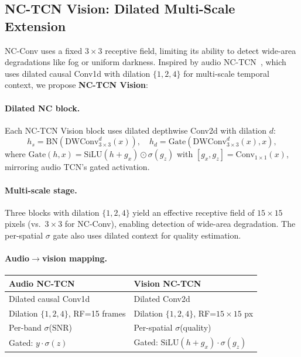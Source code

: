 \documentclass[10pt,twocolumn,letterpaper]{article}
\begin{document}
\subsection{NC-TCN Vision: Dilated Multi-Scale Extension}
\label{sec:nctcn}

NC-Conv uses a fixed $3{\times}3$ receptive field, limiting its ability to detect wide-area degradations like fog or uniform darkness.
Inspired by audio NC-TCN~\cite{choi2026ncssm}, which uses dilated causal Conv1d with dilation $\{1,2,4\}$ for multi-scale temporal context, we propose \textbf{NC-TCN Vision}:

\paragraph{Dilated NC block.}
Each NC-TCN Vision block uses dilated depthwise Conv2d with dilation $d$:
\begin{equation}
h_s = \text{BN}(\text{DWConv}_{3{\times}3}^{d}(x)), \quad
h_d = \text{Gate}(\text{DWConv}_{3{\times}3}^{d}(x), x),
\end{equation}
where $\text{Gate}(h, x) = \text{SiLU}(h + g_x) \odot \sigma(g_z)$ with $[g_x, g_z] = \text{Conv}_{1{\times}1}(x)$, mirroring audio TCN's gated activation.

\paragraph{Multi-scale stage.}
Three blocks with dilation $\{1, 2, 4\}$ yield an effective receptive field of $15{\times}15$ pixels (vs.\ $3{\times}3$ for NC-Conv), enabling detection of wide-area degradation.
The per-spatial $\sigma$ gate also uses dilated context for quality estimation.

\paragraph{Audio$\to$vision mapping.}
\begin{center}
\footnotesize
\begin{tabular}{@{}ll@{}}
Audio NC-TCN & Vision NC-TCN \\
\midrule
Dilated causal Conv1d & Dilated Conv2d \\
Dilation $\{1,2,4\}$, RF=15 frames & Dilation $\{1,2,4\}$, RF=$15{\times}15$ px \\
Per-band $\sigma$(SNR) & Per-spatial $\sigma$(quality) \\
Gated: $y \cdot \sigma(z)$ & Gated: $\text{SiLU}(h{+}g_x) \cdot \sigma(g_z)$ \\
\end{tabular}
\end{center}
\end{document}
